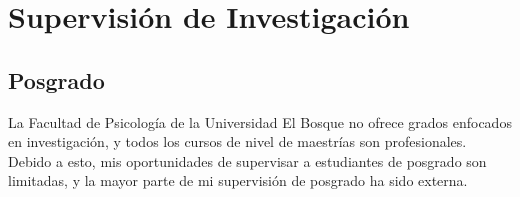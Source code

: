 \documentclass[11pt,a4paper,]{awesome-cv}
\begin{document}
\endgroup

\hypertarget{supervisiuxf3n-de-investigaciuxf3n}{%
\section{Supervisión de
Investigación}\label{supervisiuxf3n-de-investigaciuxf3n}}

\hypertarget{section}{%
\subsection{\texorpdfstring{\textbf{Posgrado}}{}}\label{section}}

\begin{footnotesize}
La Facultad de Psicología de la Universidad El Bosque no ofrece grados enfocados en investigación, y todos los cursos de nivel de maestrías son profesionales. Debido a esto, mis oportunidades de supervisar a estudiantes de posgrado son limitadas, y la mayor parte de mi supervisión de posgrado ha sido externa.
\end{footnotesize}
\end{document}
